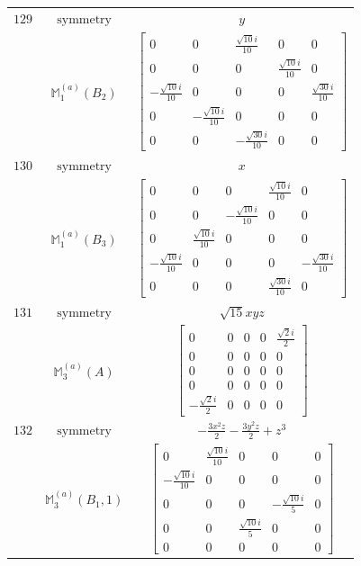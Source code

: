 \documentclass[fleqn,8pt,landscape]{jsarticle}
\begin{document}
\begin{longtable}{ccc}
$ 129 $ & $ \text{symmetry} $ & $ y $ \\
$  $ & $ \mathbb{M}_{1}^{(a)}(B_{2}) $ & $ \begin{bmatrix} 0 & 0 & \frac{\sqrt{10} i}{10} & 0 & 0 \\ 0 & 0 & 0 & \frac{\sqrt{10} i}{10} & 0 \\ - \frac{\sqrt{10} i}{10} & 0 & 0 & 0 & \frac{\sqrt{30} i}{10} \\ 0 & - \frac{\sqrt{10} i}{10} & 0 & 0 & 0 \\ 0 & 0 & - \frac{\sqrt{30} i}{10} & 0 & 0 \end{bmatrix} $ \\ \hline
$ 130 $ & $ \text{symmetry} $ & $ x $ \\
$  $ & $ \mathbb{M}_{1}^{(a)}(B_{3}) $ & $ \begin{bmatrix} 0 & 0 & 0 & \frac{\sqrt{10} i}{10} & 0 \\ 0 & 0 & - \frac{\sqrt{10} i}{10} & 0 & 0 \\ 0 & \frac{\sqrt{10} i}{10} & 0 & 0 & 0 \\ - \frac{\sqrt{10} i}{10} & 0 & 0 & 0 & - \frac{\sqrt{30} i}{10} \\ 0 & 0 & 0 & \frac{\sqrt{30} i}{10} & 0 \end{bmatrix} $ \\ \hline
$ 131 $ & $ \text{symmetry} $ & $ \sqrt{15} x y z $ \\
$  $ & $ \mathbb{M}_{3}^{(a)}(A) $ & $ \begin{bmatrix} 0 & 0 & 0 & 0 & \frac{\sqrt{2} i}{2} \\ 0 & 0 & 0 & 0 & 0 \\ 0 & 0 & 0 & 0 & 0 \\ 0 & 0 & 0 & 0 & 0 \\ - \frac{\sqrt{2} i}{2} & 0 & 0 & 0 & 0 \end{bmatrix} $ \\ \hline
$ 132 $ & $ \text{symmetry} $ & $ - \frac{3 x^{2} z}{2} - \frac{3 y^{2} z}{2} + z^{3} $ \\
$  $ & $ \mathbb{M}_{3}^{(a)}(B_{1},1) $ & $ \begin{bmatrix} 0 & \frac{\sqrt{10} i}{10} & 0 & 0 & 0 \\ - \frac{\sqrt{10} i}{10} & 0 & 0 & 0 & 0 \\ 0 & 0 & 0 & - \frac{\sqrt{10} i}{5} & 0 \\ 0 & 0 & \frac{\sqrt{10} i}{5} & 0 & 0 \\ 0 & 0 & 0 & 0 & 0 \end{bmatrix} $ \\ \hline

\end{longtable}
\end{document}
